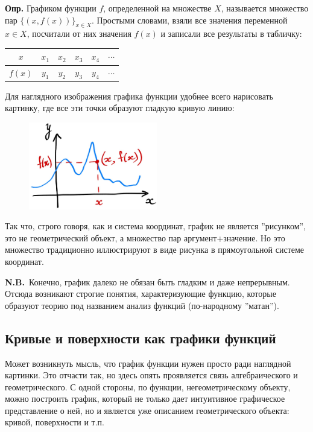 \documentclass[a4paper,12pt]{article}
\newcounter{th-counter}
\newcounter{df-counter}
\newcounter{col-counter}
\newcommand{\df}{\par\noindent\textbf{Опр.} }
\newcommand{\NB}[1]{%
  \par\medskip
  \noindent\textcolor{notecolor}{\textbf{N.B.}~#1}%
  \par\medskip
}
\begin{document}
\df Графиком функции $f$, определенной на множестве $X$, называется множество пар $\{(x,f(x))\}_{x \in X}$. Простыми словами, взяли все значения переменной $x \in X$, посчитали от них значения $f(x)$ и записали все результаты в табличку:
\begin{center}
\begin{tabular}{|c|c|c|c|c|c|}
\hline
$x$ & $x_1$ & $x_2$ & $x_3$ & $x_4$ & $\cdots$ \\
\hline
$f(x)$  & $y_1$ & $y_2$ & $y_3$ & $y_4$ & $\cdots$\\
\hline
\end{tabular}
\end{center}
Для наглядного изображения графика функции удобнее всего нарисовать картинку, где все эти точки образуют гладкую кривую линию:

\begin{figure}[h] %
    \centering
    \includegraphics[width=0.5\textwidth]{pictures/pct_function_plot.jpg}
\end{figure}

Так что, строго говоря, как и система координат, график не является ''рисунком'', это не геометрический объект, а множество пар аргумент+значение. Но это множество традиционно иллюстрируют в виде рисунка в прямоугольной системе координат.

\NB{Конечно, график далеко не обязан быть гладким и даже непрерывным. Отсюда возникают строгие понятия, характеризующие функцию, которые образуют теорию под названием анализ функций (по-народному ''матан'').}

\subsection*{Кривые и поверхности как графики функций}

Может возникнуть мысль, что график функции нужен просто ради наглядной картинки. Это отчасти так, но здесь опять проявляется связь алгебраического и геометрического. С одной стороны, по функции, негеометрическому объекту, можно построить график, который не только дает интуитивное графическое представление о ней, но и является уже описанием геометрического объекта: кривой, поверхности и т.п.
\end{document}
